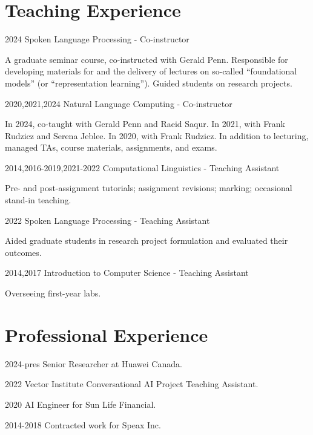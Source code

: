 \documentclass{article}
\begin{document}
\section{Teaching Experience}
\begin{CV}

  \item[2024] Spoken Language Processing - Co-instructor
  
    A graduate seminar course, co-instructed with Gerald Penn. Responsible for
    developing materials for and the delivery of lectures on so-called
    ``foundational models'' (or ``representation learning''). Guided students
    on research projects.

  \item[2020,2021,2024] Natural Language Computing - Co-instructor

    In 2024, co-taught with Gerald Penn and Raeid Saqur. In 2021, with
    Frank Rudzicz and Serena Jeblee. In 2020, with Frank Rudzicz. In addition
    to lecturing, managed TAs, course materials, assignments, and exams.

  \item[2014,2016-2019,2021-2022] Computational Linguistics - Teaching Assistant

    Pre- and post-assignment tutorials; assignment revisions; marking;
    occasional stand-in teaching.

  \item[2022] Spoken Language Processing - Teaching Assistant

    Aided graduate students in research project formulation and evaluated their
    outcomes.

  \item[2014,2017] Introduction to Computer Science - Teaching Assistant

    Overseeing first-year labs.

\end{CV}

\section{Professional Experience}

\begin{CV}
  \item[2024-pres] Senior Researcher at Huawei Canada.
  \item[2022] Vector Institute Conversational AI Project Teaching Assistant.
  \item[2020] AI Engineer for Sun Life Financial.
  \item[2014-2018] Contracted work for Speax Inc.
\end{CV}
\end{document}
